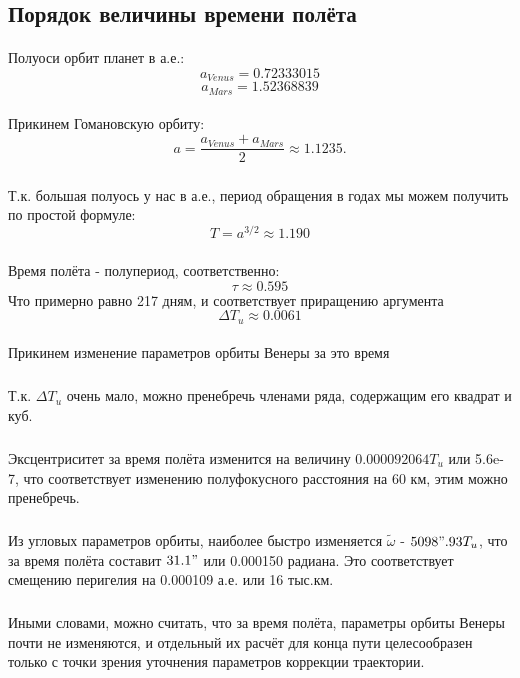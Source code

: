 \subsection{Порядок величины времени полёта}

\paragraph{}Полуоси орбит планет в а.е.:
$$a_{Venus} = 0.72333015$$
$$a_{Mars} = 1.52368839$$

\paragraph{}Прикинем Гомановскую орбиту:
$$a = \frac{a_{Venus} + a_{Mars}}{2} \approx 1.1235.$$
\subparagraph{}Т.к. большая полуось у нас в а.е., период обращения в годах мы можем получить по простой формуле:
$$T = a^{3/2} \approx 1.190$$
\subparagraph{}Время полёта - полупериод, соответственно:
$$\tau  \approx 0.595$$
Что примерно равно 217 дням, и соответствует приращению аргумента
$$\Delta T_u \approx 0.0061$$

\paragraph{}Прикинем изменение параметров орбиты Венеры за это время
\subparagraph{}Т.к. $\Delta T_u$ очень мало, можно пренебречь членами ряда, содержащим его квадрат и куб.\
\subparagraph{}Эксцентриситет за время полёта изменится на величину $0.000092064 T_u$ или 5.6e-7, что соответствует изменению полуфокусного расстояния на 60 км, этим можно пренебречь.
\subparagraph{}Из угловых параметров орбиты, наиболее быстро изменяется $\widetilde{\omega}$ - $5098".93 T_u$, что за время полёта составит $31.1"$ или 0.000150 радиана. Это соответствует смещению перигелия на 0.000109 а.е. или 16 тыс.км.

\subparagraph{}Иными словами, можно считать, что за время полёта, параметры орбиты Венеры почти не изменяются, и отдельный их расчёт для конца пути целесообразен только с точки зрения уточнения параметров коррекции траектории.